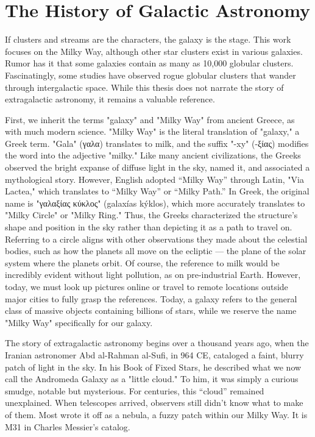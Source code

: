 \section{The History of Galactic Astronomy}

If clusters and streams are the characters, the galaxy is the stage. This work focuses on the Milky Way, although other star clusters exist in various galaxies. Rumor has it that some galaxies contain as many as 10,000 globular clusters. Fascinatingly, some studies have observed rogue globular clusters that wander through intergalactic space. While this thesis does not narrate the story of extragalactic astronomy, it remains a valuable reference. 

First, we inherit the terms "galaxy" and "Milky Way" from ancient Greece, as with much modern science. "Milky Way" is the literal translation of "galaxy," a Greek term. "Gala" (\textgreek{γαλα}) translates to milk, and the suffix "-xy" (-\textgreek{ξίας}) modifies the word into the adjective "milky." Like many ancient civilizations, the Greeks observed the bright expanse of diffuse light in the sky, named it, and associated a mythological story. However, English adopted “Milky Way” through Latin, "Via Lactea," which translates to “Milky Way” or “Milky Path.” In Greek, the original name is "\textgreek{γαλαξίας κύκλος}" (galaxías kýklos), which more accurately translates to "Milky Circle" or "Milky Ring." Thus, the Greeks characterized the structure's shape and position in the sky rather than depicting it as a path to travel on. Referring to a circle aligns with other observations they made about the celestial bodies, such as how the planets all move on the ecliptic — the plane of the solar system where the planets orbit. Of course, the reference to milk would be incredibly evident without light pollution, as on pre-industrial Earth. However, today, we must look up pictures online or travel to remote locations outside major cities to fully grasp the references. Today, a galaxy refers to the general class of massive objects containing billions of stars, while we reserve the name "Milky Way" specifically for our galaxy. 


The story of extragalactic astronomy begins over a thousand years ago, when the Iranian astronomer Abd al-Rahman al-Sufi, in 964 CE, cataloged a faint, blurry patch of light in the sky. In his Book of Fixed Stars, he described what we now call the Andromeda Galaxy as a "little cloud." To him, it was simply a curious smudge, notable but mysterious. For centuries, this “cloud” remained unexplained. When telescopes arrived, observers still didn't know what to make of them. Most wrote it off as a nebula, a fuzzy patch within our Milky Way. It is M31 in Charles Messier's catalog. 


